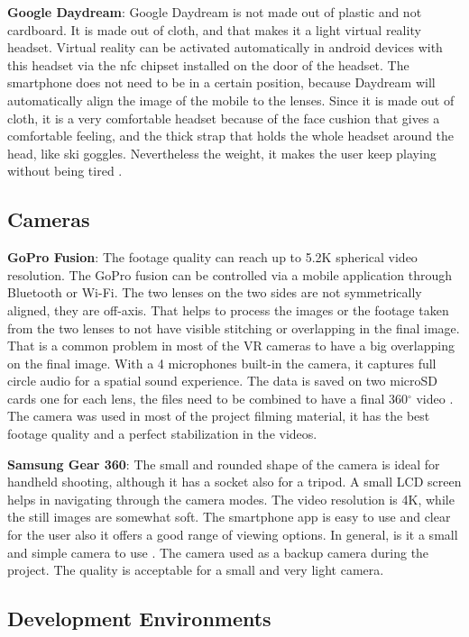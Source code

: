 \textbf{Google Daydream}: Google Daydream is not made out of plastic and not cardboard. It is made out of cloth, and that makes it a light virtual reality headset. Virtual reality can be activated automatically in android devices with this headset via the \acrfull{nfc} chipset installed on the door of the headset. The smartphone does not need to be in a certain position, because Daydream will automatically align the image of the mobile to the lenses. Since it is made out of cloth, it is a very comfortable headset because of the face cushion that gives a comfortable feeling, and the thick strap that holds the whole headset around the head, like ski goggles. Nevertheless the weight, it makes the user keep playing without being tired \citep{Amadeo2016DaydreamTechnica}. 


\subsection{Cameras}
\textbf{GoPro Fusion}: The footage quality can reach up to 5.2K spherical video resolution. The GoPro fusion can be controlled via a mobile application through Bluetooth or Wi-Fi. The two lenses on the two
sides are not symmetrically aligned, they are off-axis. That helps to
process the images or the footage taken from the two lenses to not
have visible stitching or overlapping in the final image. That is a
common problem in most of the VR cameras to have a big overlapping on the final image. With a 4 microphones built-in the camera, it captures full circle audio for a spatial sound experience. The data is saved on two microSD cards one for each lens, the files need to be combined to have a final 360$^{\circ}$ video \citep{Easton2018}. The camera was used in most of the project filming material, it has the best footage quality and a perfect stabilization in the videos.


\textbf{Samsung Gear 360}: The small and rounded shape of the camera is ideal for handheld shooting, although it has a socket also for a tripod. A small LCD screen helps in navigating through the camera modes. The video resolution is 4K, while the still images are somewhat soft. The smartphone app is easy to use and clear for the user also it offers a good range of viewing options. In general, is it a small and simple camera to use \citep{DigitalCamera2018}. The camera used as a backup camera during the project. The quality is acceptable for a small and very light camera.

\subsection{Development Environments}

